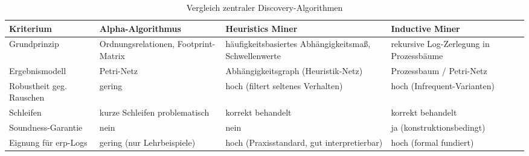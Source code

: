\begin{table}[!htb]
\centering
\caption{Vergleich zentraler Discovery-Algorithmen}\label{tab:vergleich-algorithmen}
\small
\begin{tabularx}{\textwidth}{@{}l Y Y Y@{}}
\toprule
\textbf{Kriterium} & \textbf{Alpha-Algorithmus} & \textbf{Heuristics Miner} & \textbf{Inductive Miner} \\
\midrule
Grundprinzip & Ordnungsrelationen, Footprint-Matrix & häufigkeitsbasiertes Abhängigkeitsmaß, Schwellenwerte & rekursive Log-Zerlegung in Prozessbäume \\
Ergebnismodell & Petri-Netz & Abhängigkeitsgraph (Heuristik-Netz) & Prozessbaum /\allowbreak{} Petri-Netz \\
Robustheit geg. Rauschen & gering & hoch (filtert seltenes Verhalten) & hoch (Infrequent-Varianten) \\
Schleifen & kurze Schleifen problematisch & korrekt behandelt & korrekt behandelt \\
Soundness-Garantie & nein & nein & ja (konstruktionsbedingt) \\
Eignung für \gls{erp}-Logs & gering (nur Lehrbeispiele) & hoch (Praxisstandard, gut interpretierbar) & hoch (formal fundiert) \\
\bottomrule
\end{tabularx}
\end{table}
